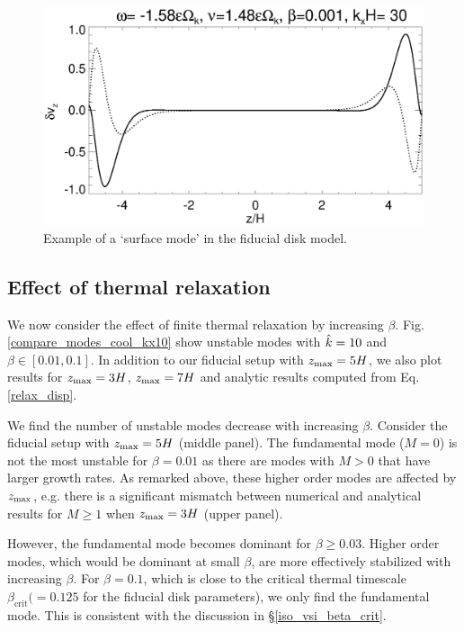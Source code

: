\begin{figure}
  \includegraphics[width=\linewidth,clip=true,trim=0cm 0cm 0cm
  0cm]{figures/eigenvectorvz_iso_surf}
  \caption{Example of a `surface mode' in the fiducial disk model.
    \label{lowfreq_eigenfunc_surf}
  }
\end{figure}

\subsection{Effect of thermal relaxation}\label{therm_relax_eff}
We now consider the effect of finite thermal relaxation by increasing 
$\beta$. %
Fig. \ref{compare_modes_cool_kx10} show unstable modes with $\hat{k}=10$ 
and $\beta\in[0.01,0.1]$. In addition to our fiducial setup with 
$z_\mathrm{max}=5H$, we also plot results for $z_\mathrm{max}=3H$, $z_\mathrm{max}=7H$ and 
analytic results computed from Eq. \ref{relax_disp}.  %

We find the number of unstable modes decrease with increasing
$\beta$. Consider the fiducial setup with $z_\mathrm{max}=5H$ 
(middle panel). The fundamental mode ($M=0$) is not the most unstable for   
$\beta=0.01$ as there are modes with $M>0$ that have larger growth 
rates. As remarked above, these higher order modes are affected by
$z_\mathrm{max}$, e.g. there is a significant mismatch between numerical and 
analytical results for $M\geq1$ when $z_\mathrm{max}=3H$ (upper panel). 


However, the fundamental mode becomes dominant for $\beta \geq 
0.03$. Higher order modes, which would be dominant at small $\beta$, 
are more effectively stabilized with increasing $\beta$. For 
$\beta=0.1$, which is close to the critical thermal timescale
$\beta_\mathrm{crit} (=0.125$ for the fiducial disk
parameters), we only find the fundamental mode. This is consistent with
the discussion in \S\ref{iso_vsi_beta_crit}.    

